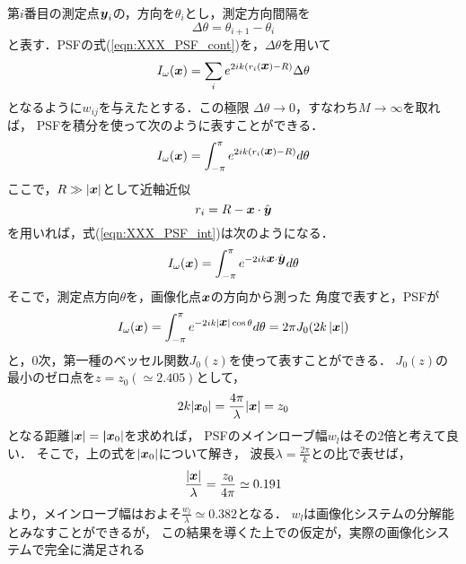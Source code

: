 第$i$番目の測定点$\mbox{\boldmath $y$}_i$の，方向を$\theta_i$とし，測定方向間隔を
\begin{equation}
	\Delta \theta = \theta_{i+1}-\theta_i
	\label{eqn:}
\end{equation}
と表す．PSFの式(\ref{eqn:XXX_PSF_cont})を，$\Delta \theta$を用いて
\begin{equation}
	I_\omega(\mbox{\boldmath $x$})
		=
	\sum_{i} 
	e^{
	2ik
	\left(
		r_i(\mbox{\boldmath $x$})-R
	\right)
	}
	\Delta \theta
	\label{eqn:XXX_PSF_dth}
\end{equation}
となるように$w_{ij}$を与えたとする．この極限
$\Delta \theta \rightarrow 0$，すなわち$M\rightarrow \infty$を取れば，
PSFを積分を使って次のように表すことができる．
\begin{equation}
	I_\omega(\mbox{\boldmath $x$})
		=
	\int_{-\pi}^{\pi}
	e^{
	2ik
	\left(
		r_i(\mbox{\boldmath $x$})-R
	\right)
	}
	d\theta
	\label{eqn:XXX_PSF_int}
\end{equation}
ここで，$R\gg |\mbox{\boldmath $x$}|$として近軸近似
\begin{equation}
	r_i=R-\mbox{\boldmath $x$}\cdot \hat{\mbox{\boldmath $y$}}
	\label{eqn:}
\end{equation}
を用いれば，式(\ref{eqn:XXX_PSF_int})は次のようになる．
\begin{equation}
	I_\omega(\mbox{\boldmath $x$})
		=
	\int_{-\pi}^{\pi}
	e^{
	-2ik \mbox{\boldmath $x$}\cdot \hat{\mbox{\boldmath $y$}}
	}
	d\theta
	\label{eqn:XXX_PSF_int2}
\end{equation}
そこで，測定点方向$\theta$を，画像化点$\mbox{\boldmath $x$}$の方向から測った
角度で表すと，PSFが
\begin{equation}
	I_\omega(\mbox{\boldmath $x$})
		=
	\int_{-\pi}^{\pi}
	e^{
	-2ik |\mbox{\boldmath $x$}| \cos \theta
	}
	d\theta
	=
	2\pi J_0(2k\left|\mbox{\boldmath $x$}\right|)
	\label{eqn:XXX_PSF_J0}
\end{equation}
と，0次，第一種のベッセル関数$J_0(z)$を使って表すことができる．
$J_0(z)$の最小のゼロ点を$z=z_0(\simeq 2.405)$として，
\begin{equation}
	2k|\mbox{\boldmath $x$}_0|=\frac{4\pi}{\lambda}|\mbox{\boldmath $x$}|=z_0
	\label{eqn:}
\end{equation}
となる距離$|\mbox{\boldmath $x$}|=\mbox{\boldmath $|$}\mbox{\boldmath $x$}_0|$を求めれば，
PSFのメインローブ幅$w_{l}$はその2倍と考えて良い．
そこで，上の式を$|\mbox{\boldmath $x$}_0|$について解き，
波長$\lambda=\frac{2\pi}{k}$との比で表せば，
\begin{equation}
	\frac{|\mbox{\boldmath $x$}|}{\lambda}=\frac{z_0}{4\pi}\simeq 0.191
	\label{eqn:}
\end{equation}
より，メインローブ幅はおよそ$\frac{w_l}{\lambda}\simeq 0.382$となる．
$w_l$は画像化システムの分解能とみなすことができるが，
この結果を導くた上での仮定が，実際の画像化システムで完全に満足される
